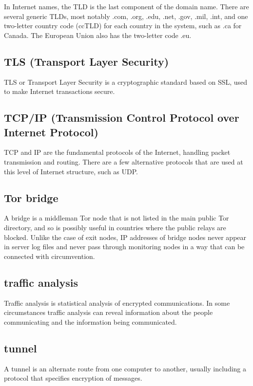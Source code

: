 In Internet names, the TLD is the last component of the domain name.
There are several generic TLDs, most notably .com, .org, .edu, .net,
.gov, .mil, .int, and one two-letter country code (ccTLD) for each
country in the system, such as .ca for Canada. The European Union also
has the two-letter code .eu.

\subsection{TLS (Transport Layer Security)}

TLS or Transport Layer Security is a cryptographic standard based on
SSL, used to make Internet transactions secure.

\subsection{TCP/IP (Transmission Control Protocol over Internet
Protocol)}

TCP and IP are the fundamental protocols of the Internet, handling
packet transmission and routing. There are a few alternative protocols
that are used at this level of Internet structure, such as UDP.

\subsection{Tor bridge}

A bridge is a middleman Tor node that is not listed in the main public
Tor directory, and so is possibly useful in countries where the public
relays are blocked. Unlike the case of exit nodes, IP addresses of
bridge nodes never appear in server log files and never pass through
monitoring nodes in a way that can be connected with circumvention.

\subsection{traffic analysis}

Traffic analysis is statistical analysis of encrypted communications. In
some circumstances traffic analysis can reveal information about the
people communicating and the information being communicated.

\subsection{tunnel}

A tunnel is an alternate route from one computer to another, usually
including a protocol that specifies encryption of messages.

